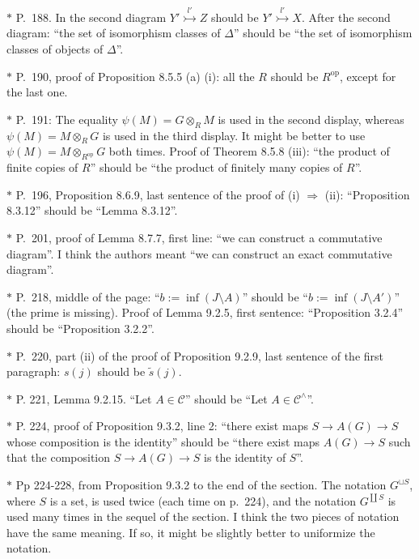 \documentclass[12pt]{article}%
\theoremstyle{remark}
\theoremstyle{definition}
\newcommand{\C}{\mathcal C}
\newcommand{\then}{\Rightarrow}
\DeclareMathOperator{\op}{op}
\begin{document}
\noindent $*$ P.~188. In the second diagram $Y'\overset{l'}{\rightarrowtail}Z$ should be $Y'\overset{l'}{\rightarrowtail}X$. After the second diagram: ``the set of isomorphism classes of $\Delta$'' should be ``the set of isomorphism classes of objects of $\Delta$''.

\noindent $*$ P.~190, proof of Proposition 8.5.5 (a) (i): all the $R$ should be $R^{\op}$, except for the last one.

\noindent $*$ P.~191: The equality $\psi(M)=G\otimes_RM$ is used in the second display, whereas $\psi(M)=M\otimes_RG$ is used in the third display. It might be better to use $\psi(M)=M\otimes_{R^{\op}}G$ both times. Proof of Theorem 8.5.8 (iii): ``the product of finite copies of $R$'' should be ``the product of finitely many copies of $R$''.

\noindent $*$ P.~196, Proposition 8.6.9, last sentence of the proof of (i) $\then$ (ii): ``Proposition 8.3.12'' should be ``Lemma 8.3.12''.


\noindent $*$ P.~201, proof of Lemma 8.7.7, first line: ``we can construct a commutative diagram''. I think the authors meant ``we can construct an exact commutative diagram''.

\noindent $*$ P.~218, middle of the page: ``$b:=\inf(J\setminus A)$'' should be ``$b:=\inf(J\setminus A')$'' (the prime is missing). Proof of Lemma 9.2.5, first sentence: ``Proposition 3.2.4'' should be ``Proposition 3.2.2''.

\noindent $*$ P.~220, part (ii) of the proof of Proposition 9.2.9, last sentence of the first paragraph: $s(j)$ should be $\tilde s(j)$.

\noindent $*$ P. 221, Lemma 9.2.15. ``Let $A\in\C$'' should be ``Let $A\in\C^\wedge$''.

\noindent $*$ P. 224, proof of Proposition 9.3.2, line 2: ``there exist maps $S\to A(G)\to S$ whose composition is the identity'' should be ``there exist maps $A(G)\to S$ such that the composition $S\to A(G)\to S$ is the identity of $S$''.

\noindent $*$ Pp 224-228, from Proposition 9.3.2 to the end of the section. The notation $G^{\sqcup S}$, where $S$ is a set, is used twice (each time on p.~224), and the notation $G^{\coprod S}$ is used many times in the sequel of the section. I think the two pieces of notation have the same meaning. If so, it might be slightly better to uniformize the notation.
\end{document}
